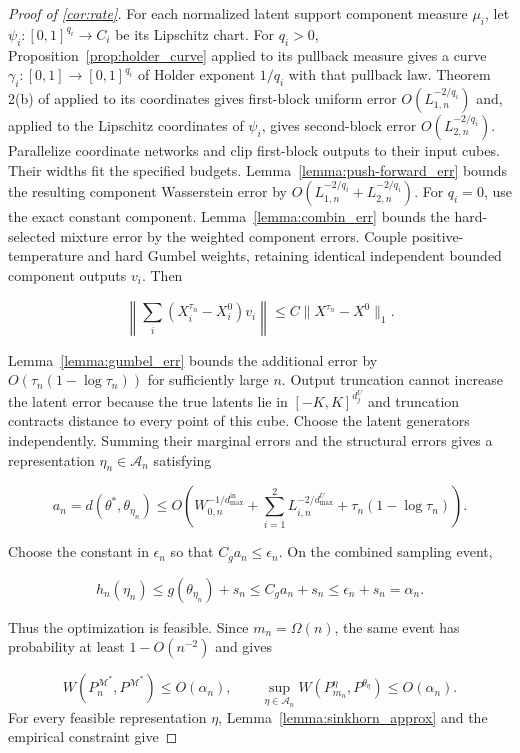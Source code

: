 \begin{proof}[Proof of \cref{cor:rate}]
For each normalized latent support component measure $\mu_i$, let $\psi_i:[0,1]^{q_i}\rightarrow C_i$ be its Lipschitz chart. For $q_i>0$, Proposition~\ref{prop:holder_curve} applied to its pullback measure gives a curve $\gamma_i:[0,1]\rightarrow[0,1]^{q_i}$ of Holder exponent $1/q_i$ with that pullback law. Theorem 2(b) of \cite{Yarotsky2018OptimalAO} applied to its coordinates gives first-block uniform error $O(L_{1,n}^{-2/q_i})$ and, applied to the Lipschitz coordinates of $\psi_i$, gives second-block error $O(L_{2,n}^{-2/q_i})$. Parallelize coordinate networks and clip first-block outputs to their input cubes. Their widths fit the specified budgets. Lemma~\ref{lemma:push-forward_err} bounds the resulting component Wasserstein error by $O(L_{1,n}^{-2/q_i}+L_{2,n}^{-2/q_i})$. For $q_i=0$, use the exact constant component. Lemma~\ref{lemma:combin_err} bounds the hard-selected mixture error by the weighted component errors. Couple positive-temperature and hard Gumbel weights, retaining identical independent bounded component outputs $v_i$. Then

\[
\left\|\sum_i(X_i^{\tau_n}-X_i^0)v_i\right\|\leqslant C\|X^{\tau_n}-X^0\|_1.
\]

Lemma~\ref{lemma:gumbel_err} bounds the additional error by $O(\tau_n(1-\log\tau_n))$ for sufficiently large $n$. Output truncation cannot increase the latent error because the true latents lie in $[-K,K]^{d_j^U}$ and truncation contracts distance to every point of this cube. Choose the latent generators independently. Summing their marginal errors and the structural errors gives a representation $\eta_n\in\mathcal A_n$ satisfying

\[
a_n=d(\theta^*,\theta_{\eta_n})\leqslant O\left(W_{0,n}^{-1/d_{\max}^{\text{in}}}+\sum_{i=1}^2L_{i,n}^{-2/d_{\max}^U}+\tau_n(1-\log\tau_n)\right).
\]

Choose the constant in $\epsilon_n$ so that $C_ga_n\leqslant\epsilon_n$. On the combined sampling event,

\[
h_n(\eta_n)\leqslant g(\theta_{\eta_n})+s_n\leqslant C_ga_n+s_n\leqslant\epsilon_n+s_n=\alpha_n.
\]

Thus the optimization is feasible. Since $m_n=\Omega(n)$, the same event has probability at least $1-O(n^{-2})$ and gives

\[
W(P_n^{\mathcal M^*},P^{\mathcal M^*})\leqslant O(\alpha_n),\qquad\sup_{\eta\in\mathcal A_n}W(P_{m_n}^\eta,P^{\theta_\eta})\leqslant O(\alpha_n).
\]
 For every feasible representation $\eta$, Lemma~\ref{lemma:sinkhorn_approx} and the empirical constraint give


\end{proof}
